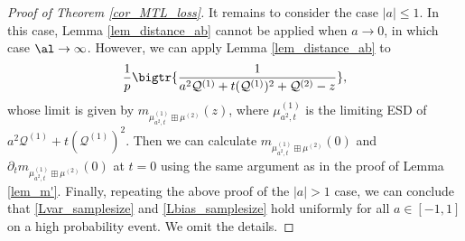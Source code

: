 \documentclass[aos,preprint]{imsart}
\newcommand{\Qa}{\mathcal Q^{(1)}}
\newcommand{\Qb}{\mathcal Q^{(2)}}
\newcommand{\mua}{\mu^{(1)}}
\newcommand{\mub}{\mu^{(2)}}
\begin{document}
\begin{proof}[Proof of Theorem \ref{cor_MTL_loss}]
It remains to consider the case $|a|\le 1$. In this case, Lemma \ref{lem_distance_ab} cannot be applied when $a\to 0$, in which case $\al\to\infty$. However, we can apply Lemma \ref{lem_distance_ab} to 
$$\frac{1}{p}\bigtr{\frac{1}{a^2 \Qa+t(\Qa)^2 + \Qb-z}},$$
 whose limit is given by $ m_{\mua_{a^2,t}\boxplus \mub}(z)$, where $\mua_{a^2,t}$ is the limiting ESD of $a^2 \Qa+t(\Qa)^2$. Then we can calculate $ m_{\mua_{a^2,t}\boxplus \mub}(0)$ and $\partial_t m_{\mua_{a^2,t}\boxplus \mub}(0)$ at $t=0$ using the same argument as in the proof of Lemma \ref{lem_m'}. Finally, repeating the above proof of the $|a|>1$ case, we can conclude that \eqref{Lvar_samplesize} and \eqref{Lbias_samplesize} hold uniformly for all $a\in [-1,1]$ on a high probability event. We omit the details.
\end{proof}
\end{document}

